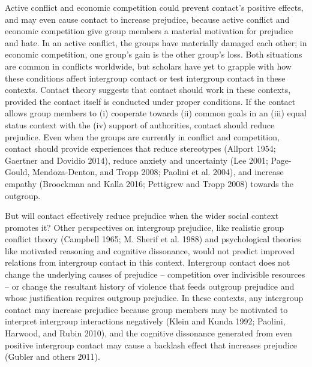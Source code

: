 \documentclass[11pt]{article}
\begin{document}
Active conflict and economic competition could prevent contact's
positive effects, and may even cause contact to increase prejudice,
because active conflict and economic competition give group members a
material motivation for prejudice and hate. In an active conflict, the
groups have materially damaged each other; in economic competition, one
group's gain is the other group's loss. Both situations are common in
conflicts worldwide, but scholars have yet to grapple with how these
conditions affect intergroup contact or test intergroup contact in these
contexts. Contact theory suggests that contact should work in these
contexts, provided the contact itself is conducted under proper
conditions. If the contact allows group members to (i) cooperate towards
(ii) common goals in an (iii) equal status context with the (iv) support
of authorities, contact should reduce prejudice. Even when the groups
are currently in conflict and competition, contact should provide
experiences that reduce stereotypes (Allport 1954; Gaertner and Dovidio
2014), reduce anxiety and uncertainty (Lee 2001; Page-Gould,
Mendoza-Denton, and Tropp 2008; Paolini et al. 2004), and increase
empathy (Broockman and Kalla 2016; Pettigrew and Tropp 2008) towards the
outgroup.

But will contact effectively reduce prejudice when the wider social
context promotes it? Other perspectives on intergroup prejudice, like
realistic group conflict theory (Campbell 1965; M. Sherif et al. 1988)
and psychological theories like motivated reasoning and cognitive
dissonance, would not predict improved relations from intergroup contact
in this context. Intergroup contact does not change the underlying
causes of prejudice -- competition over indivisible resources -- or
change the resultant history of violence that feeds outgroup prejudice
and whose justification requires outgroup prejudice. In these contexts,
any intergroup contact may increase prejudice because group members may
be motivated to interpret intergroup interactions negatively (Klein and
Kunda 1992; Paolini, Harwood, and Rubin 2010), and the cognitive
dissonance generated from even positive intergroup contact may cause a
backlash effect that increases prejudice (Gubler and others 2011).
\end{document}
